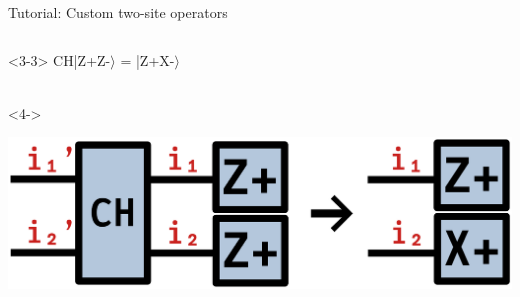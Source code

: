 \begin{frame}[fragile]{Tutorial: Custom two-site operators}
\begin{columns}
\begin{column}{4.5cm}
\begin{onlyenv}<3-3>
CH|Z+Z-$\rangle$ = |Z+X-$\rangle$ \\
~\\
\end{onlyenv}

\begin{onlyenv}<4->
\vspace*{0.0cm}
\begin{center}
\includegraphics[width=1.0\textwidth]{
  slides/assets/CHZp1Zp2_to_Zp1Xp2.png
}
\end{center}
\vspace*{0.0cm}
\end{onlyenv}

\end{column}

\end{columns}

\end{frame}
